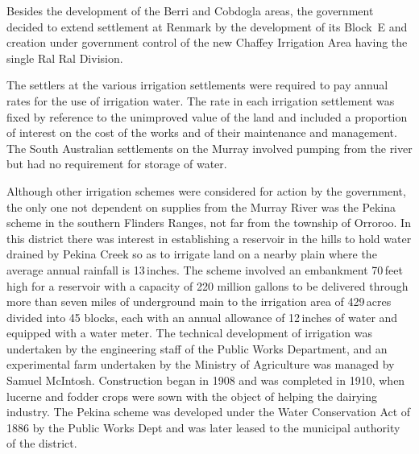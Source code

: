 Besides the development of the Berri and Cobdogla areas, the
government decided to extend settlement at Renmark by the development
of its Block~E and creation under government control of the new
Chaffey Irrigation Area  having the
single Ral Ral Division.

The settlers at the various irrigation settlements were required to
pay annual rates for the use of irrigation water.  The rate in each
irrigation settlement was fixed by reference to the unimproved value
of the land and included a proportion of interest on the cost of the
works and of their maintenance and
management. 
The South Australian settlements on the Murray involved pumping from
the river but had no requirement for storage of water.

Although other irrigation schemes were considered for action by the
government, the only one not dependent on supplies from the Murray
River was the Pekina scheme  in the
southern Flinders Ranges,  not far from the
township of Orroroo.  In this district there was
interest in establishing a reservoir in
the hills to hold water drained by Pekina Creek 
so as to irrigate land on a nearby plain where the average annual
rainfall is 13\,inches.  The scheme involved an embankment 70\,feet
high for a reservoir with a capacity of 220 million gallons to be
delivered through more than seven miles of underground main to the
irrigation area of 429\,acres divided into 45 blocks, each with an
annual allowance of 12\,inches of water and equipped with a water
meter.  The technical development of irrigation was undertaken by the
engineering staff of the Public Works Department, and an experimental
farm undertaken by the Ministry of Agriculture was managed by Samuel
McIntosh.  Construction began in 1908 and was completed in 1910, when
lucerne and fodder crops were sown with the object of
helping the dairying industry.  The Pekina scheme was
developed under the Water Conservation Act of 1886
 by the Public Works
Dept and was later leased to the municipal authority of the
district.


